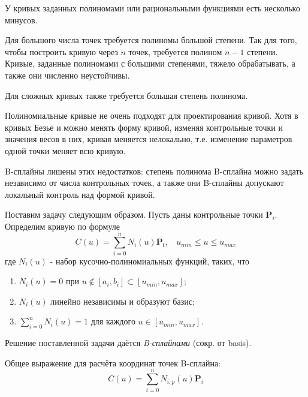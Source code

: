 \documentclass{bmstu}
\newenvironment{gost-itemize}
{\begin{itemize}[label=---,itemindent=\parindent,leftmargin=0pt]}
	{\end{itemize}}
\begin{document}
У кривых заданных полиномами или рациональными функциями есть несколько минусов.
\begin{gost-itemize}
    \item Для большого числа точек требуется полиномы большой степени. Так для того, чтобы построить кривую через $n$ точек, требуется полином $n-1$ степени. Кривые, заданные полиномами с большими степенями, тяжело обрабатывать, а также они численно неустойчивы.
    \item Для сложных кривых также требуется большая степень полинома.
    \item Полиномиальные кривые не очень подходят для проектирования кривой. Хотя в кривых Безье и можно менять форму кривой, изменяя контрольные точки и  значения весов в них, кривая меняется нелокально, т.е. изменение параметров одной точки меняет всю кривую.
\end{gost-itemize}

B-сплайны лишены этих недостатков: степень полинома B-сплайна можно задать независимо от числа контрольных точек, а также они B-сплайны допускают локальный контроль над формой кривой.

Поставим задачу следующим образом. Пусть даны контрольные точки $\mathbf{P}_i$. Определим кривую по формуле
\begin{equation}
    C(u) = \sum\limits_{i=0}^{n}N_i(u)\mathbf{P_i},~~~~u_{min}\le u \le u_{max}
\end{equation}
где $N_i(u)$ - набор кусочно-полиномиальных функций, таких, что
\begin{enumerate}
    \item $N_i(u) = 0$ при $u\notin[a_i, b_i]\subset[u_{min}, u_{max}]$;
    \item $N_i(u)$ линейно независимы и образуют базис;
    \item $\sum\limits_{i=0}^nN_i(u) = 1$ для каждого $u\in[u_{min}, u_{max}]$.
\end{enumerate}

Решение поставленной задачи даётся \textit{B-сплайнами} (сокр. от basis).

Общее выражение для расчёта координат точек B-сплайна:
\begin{equation}
    C(u) = \sum\limits_{i=0}^nN_{i,p}(u)\mathbf{P}_i
\end{equation}
\end{document}
